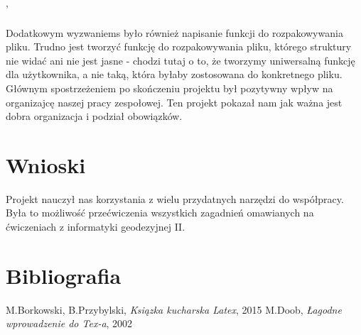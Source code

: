 '\documentclass[a4paper,12pt]{article}
\begin{document}
Dodatkowym wyzwaniems było również napisanie funkcji do rozpakowywania pliku. Trudno jest tworzyć funkcję do rozpakowywania pliku, którego struktury nie widać ani nie jest jasne - chodzi tutaj o to, że tworzymy uniwersalną funkcję dla użytkownika, a nie taką, która byłaby zostosowana do konkretnego pliku.\\

Głównym spostrzeżeniem po skończeniu projektu był pozytywny wpływ na organizajcę naszej pracy zespołowej. Ten projekt pokazał nam jak ważna jest dobra organizacja i podział obowiązków. 

\section{Wnioski}

Projekt nauczył nas korzystania z wielu przydatnych narzędzi do współpracy. Była to możliwość przećwiczenia wszystkich zagadnień omawianych na ćwiczeniach z informatyki geodezyjnej II. 

\section{Bibliografia}
\begin{thebibliography}{9}
 M.Borkowski, B.Przybylski, \emph{Ksiązka kucharska Latex}, 2015
 M.Doob, \emph{Łagodne wprowadzenie do Tex-a}, 2002

\end{thebibliography}
\end{document}
